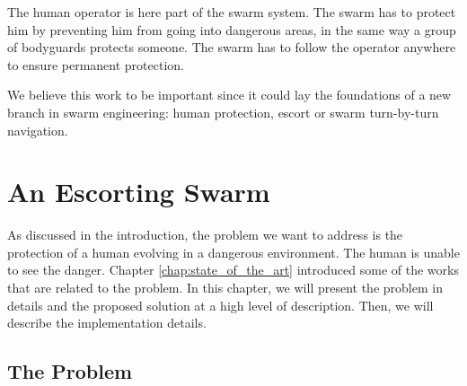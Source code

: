 \documentclass[oneside, a4paper, 12pt]{memoir}
\begin{document}
	The human operator is here part of the swarm system. The swarm has to protect him by preventing him from going into dangerous areas, in the same way a group of bodyguards protects someone. The swarm has to follow the operator anywhere to ensure permanent protection.
	
	We believe this work to be important since it could lay the foundations of a new branch in swarm engineering: human protection, escort or swarm turn-by-turn navigation.

\chapter{An Escorting Swarm}
\label{chap:escorting_swarm}

As discussed in the introduction, the problem we want to address is the protection of a human evolving in a dangerous environment. The human is unable to see the danger. Chapter \ref{chap:state_of_the_art} introduced some of the works that are related to the problem. In this chapter, we will present the problem in details and the proposed solution at a high level of description. Then, we will describe the implementation details.

	\section{The Problem}
		\label{sec:the_problem}

	
\end{document}

